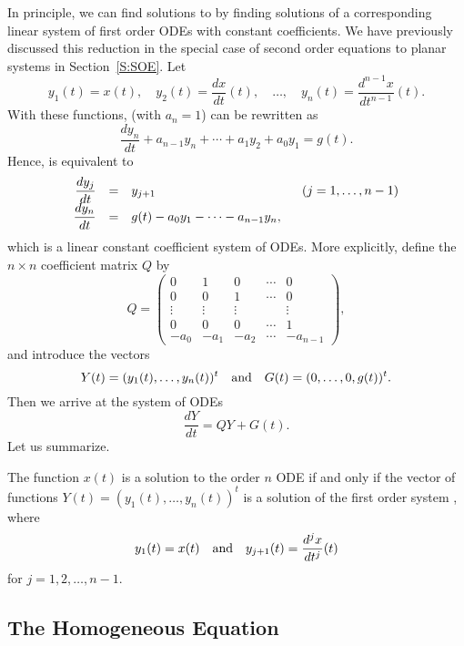 In principle, we can find solutions to  by finding 
solutions of a corresponding 
linear system of first order 
ODEs with 
constant coefficients.  We have previously discussed this reduction in
the special case of second order equations to planar systems in 
Section~\ref{S:SOE}.  Let
\begin{equation}   \label{eq:trick}
y_1(t)=x(t),\quad y_2(t)=\frac{dx}{dt}(t),\quad
\ldots, \quad  y_n(t)=\frac{d^{n-1}x}{dt^{n-1}}(t).
\end{equation}
With these functions,  (with $a_n=1$) can be rewritten as
\[
\frac{dy_n}{dt} + a_{n-1} y_n + \cdots + a_1 y_2 + a_0 y_1 = g(t).
\]
Hence,  is equivalent to
\arraystart
\[
\begin{array}{rcl}
\displaystyle \frac{dy_j}{dt}&=&y_{j+1} \hspace{1.6in} (j=1,\ldots,n-1)\\
\displaystyle \frac{dy_n}{dt}&=& g(t) - a_0y_1 - \cdots - a_{n-1} y_n,
\end{array}
\]
\arrayfinish
which is a linear constant coefficient system of ODEs.  More explicitly,
define the $n\times n$ coefficient matrix $Q$ by 
\begin{equation}   \label{eq:coefma}
Q = \left(\begin{array}{ccccc}
0 & 1 & 0 & \cdots & 0\\
0 & 0 & 1 & \cdots & 0\\
\vdots & \vdots & \vdots & & \vdots\\
0 & 0 & 0 & \cdots & 1\\
-a_0 & -a_1 &  -a_2 & \cdots & -a_{n-1}
\end{array}\right),
\end{equation}
and introduce the vectors 
\[
Y(t) = (y_1(t),\ldots,y_n(t))^t  \quad\mbox{and}\quad
G(t) = (0,\ldots,0,g(t))^t.  
\]
Then we arrive at the system of ODEs
\begin{equation}  \label{eq:highrw}
\frac{dY}{dt} = QY+G(t).
\end{equation}
Let us summarize.
\begin{prop}   \label{prop:ho1}
The function $x(t)$ is a solution to the order $n$ ODE   
if and only if the vector of functions $Y(t)=(y_1(t),\ldots,y_n(t))^t$ is 
a solution of the first order system , where 
\[
y_1(t) = x(t) \quad\mbox{and}\quad y_{j+1}(t)=\displaystyle \frac{d^jx}{dt^j}(t) 
\]
for $j=1,2,\ldots,n-1$.
\end{prop}

\subsection*{The Homogeneous Equation}


